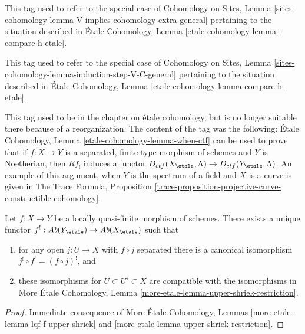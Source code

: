 \begin{remark}
\label{remark-V-implies-cohomology-etale-h-extra}
This tag used to refer to the special case of
Cohomology on Sites, Lemma
\ref{sites-cohomology-lemma-V-implies-cohomology-extra-general}
pertaining to the situation described in
\'Etale Cohomology, Lemma \ref{etale-cohomology-lemma-compare-h-etale}.
\end{remark}

\begin{remark}
\label{remark-induction-step-V-C-etale-h}
This tag used to refer to the special case of
Cohomology on Sites, Lemma
\ref{sites-cohomology-lemma-induction-step-V-C-general}
pertaining to the situation described in
\'Etale Cohomology, Lemma \ref{etale-cohomology-lemma-compare-h-etale}.
\end{remark}

\begin{remark}
\label{remark-how-used}
This tag used to be in the chapter on \'etale cohomology, but is no
longer suitable there because of a reorganization. The content of
the tag was the following:
\'Etale Cohomology, Lemma \ref{etale-cohomology-lemma-when-ctf}
can be used to prove that if $f : X \to Y$ is a separated, finite type
morphism of schemes and $Y$ is Noetherian, then $Rf_!$ induces a functor
$D_{ctf}(X_\etale, \Lambda) \to D_{ctf}(Y_\etale, \Lambda)$.
An example of this argument, when $Y$ is the spectrum of a field and
$X$ is a curve is given in The Trace Formula,
Proposition \ref{trace-proposition-projective-curve-constructible-cohomology}.
\end{remark}

\begin{lemma}
\label{lemma-glue-f-upper-shriek}
Let $f : X \to Y$ be a locally quasi-finite morphism of schemes.
There exists a unique functor
$f^! : \textit{Ab}(Y_\etale) \to \textit{Ab}(X_\etale)$ such that
\begin{enumerate}
\item for any open $j : U \to X$ with $f \circ j$ separated there
is a canonical isomorphism $j^! \circ f^! = (f \circ j)^!$, and
\item these isomorphisms for $U \subset U' \subset X$ are compatible
with the isomorphisms in More \'Etale Cohomology, Lemma
\ref{more-etale-lemma-upper-shriek-restriction}.
\end{enumerate}
\end{lemma}

\begin{proof}
Immediate consequence of More \'Etale Cohomology, Lemmas
\ref{more-etale-lemma-lqf-f-upper-shriek} and
\ref{more-etale-lemma-upper-shriek-restriction}.
\end{proof}

